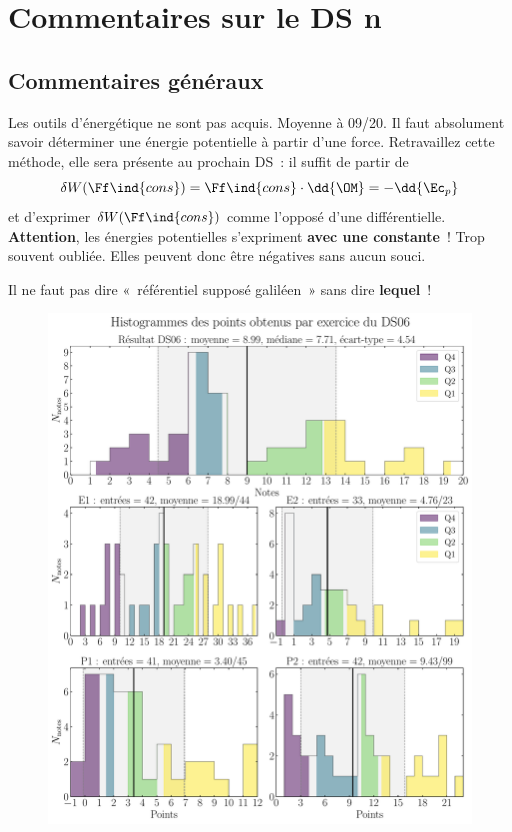 \documentclass[a4paper, 10pt, final, garamond]{book}
\begin{document}
\setcounter{chapter}{5}

\chapter{Commentaires sur le DS n}

\section{Commentaires généraux}

Les outils d'énergétique ne sont pas acquis. Moyenne à 09/20. Il faut absolument
savoir déterminer une énergie potentielle à partir d'une force. Retravaillez
cette méthode, elle sera présente au prochain DS~: il suffit de partir de
\[
	\delta W(\Ff\ind{cons}) = \Ff\ind{cons}\cdot \dd{\OM} = -\dd{\Ec_p}
\]
et d'exprimer $\delta W(\Ff\ind{cons})$ comme l'opposé d'une différentielle.
\smallbreak
\textbf{Attention}, les énergies potentielles s'expriment \textbf{avec une
	constante}~! Trop souvent oubliée. Elles peuvent donc être négatives sans
aucun souci.
\smallbreak
\begin{center}
	\large Il ne faut pas dire «~référentiel supposé galiléen~» sans dire
	\textbf{lequel}~!
\end{center}

\begin{figure}[htbp!]
	\centering
	\includegraphics[width=.8\linewidth]{DS06_hist_all}
\end{figure}
\end{document}
